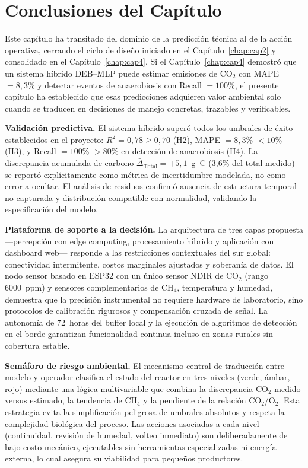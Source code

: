 \section{Conclusiones del Capítulo}
\label{sec:cap5_conclusiones}

Este capítulo ha transitado del dominio de la predicción técnica al de la acción operativa, cerrando el ciclo de diseño iniciado en el Capítulo~\ref{chap:cap2} y consolidado en el Capítulo~\ref{chap:cap4}. Si el Capítulo~\ref{chap:cap4} demostró que un sistema híbrido DEB--MLP puede estimar emisiones de CO$_2$ con MAPE $= 8{,}3$\% y detectar eventos de anaerobiosis con Recall $= 100$\%, el presente capítulo ha establecido que esas predicciones adquieren valor ambiental solo cuando se traducen en decisiones de manejo concretas, trazables y verificables.

\textbf{Validación predictiva.} El sistema híbrido superó todos los umbrales de éxito establecidos en el proyecto: $R^2 = 0{,}78 \geq 0{,}70$ (H2), MAPE $= 8{,}3$\% $< 10$\% (H3), y Recall $= 100$\% $> 80$\% en detección de anaerobiosis (H4). La discrepancia acumulada de carbono $\bar{\Delta}_{\mathrm{Total}} = +5{,}1$~g~C (3{,}6\% del total medido) se reportó explícitamente como métrica de incertidumbre modelada, no como error a ocultar. El análisis de residuos confirmó ausencia de estructura temporal no capturada y distribución compatible con normalidad, validando la especificación del modelo.

\textbf{Plataforma de soporte a la decisión.} La arquitectura de tres capas propuesta ---percepción con edge computing, procesamiento híbrido y aplicación con dashboard web--- responde a las restricciones contextuales del sur global: conectividad intermitente, costos marginales ajustados y soberanía de datos. El nodo sensor basado en ESP32 con un único sensor NDIR de CO$_2$ (rango 6000~ppm) y sensores complementarios de CH$_4$, temperatura y humedad, demuestra que la precisión instrumental no requiere hardware de laboratorio, sino protocolos de calibración rigurosos y compensación cruzada de señal. La autonomía de 72~horas del buffer local y la ejecución de algoritmos de detección en el borde garantizan funcionalidad continua incluso en zonas rurales sin cobertura estable.

\textbf{Semáforo de riesgo ambiental.} El mecanismo central de traducción entre modelo y operador clasifica el estado del reactor en tres niveles (verde, ámbar, rojo) mediante una lógica multivariable que combina la discrepancia CO$_2$ medido versus estimado, la tendencia de CH$_4$ y la pendiente de la relación CO$_2$/O$_2$. Esta estrategia evita la simplificación peligrosa de umbrales absolutos y respeta la complejidad biológica del proceso. Las acciones asociadas a cada nivel (continuidad, revisión de humedad, volteo inmediato) son deliberadamente de bajo costo mecánico, ejecutables sin herramientas especializadas ni energía externa, lo cual asegura su viabilidad para pequeños productores.

